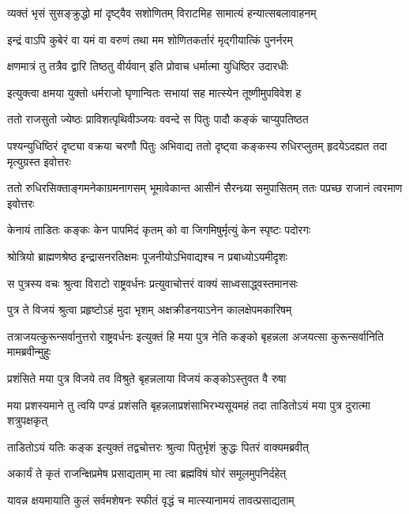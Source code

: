\twolineshloka
{व्यक्तं भृसं सुसङ्क्रुद्धो मां दृष्ट्वैव सशोणितम्}
{विराटमिह सामात्यं हन्यात्सबलावाहनम्}


\twolineshloka
{इन्द्रं वाऽपि कुबेरं वा यमं वा वरुणं तथा}
{मम शोणितकर्तारं मृद्गीयात्किं पुनर्नरम्}


\twolineshloka
{क्षणमात्रं तु तत्रैव द्वारि तिष्ठतु वीर्यवान्}
{इति प्रोवाच धर्मात्मा युधिष्ठिर उदारधीः}


\twolineshloka
{इत्युक्त्वा क्षमया युक्तो धर्मराजो घृणान्वितः}
{सभायां सह मात्स्येन तूष्णीमुपविवेश ह}


\twolineshloka
{ततो राजसुतो ज्येष्ठः प्राविशत्पृथिवीञ्जयः}
{ववन्दे स पितुः पादौ कङ्कं चाप्युपतिष्ठत}


\threelineshloka
{पश्यन्युधिष्ठिरं दृष्ट्या वक्रया चरणौ पितुः}
{अभिवाद्य ततो दृष्ट्वा कङ्कस्य रुधिरप्लुतम्}
{हृदयेऽदह्यत तदा मृत्युग्रस्त इवोत्तरः}


\threelineshloka
{ततो रुधिरसिक्ताङ्गमनेकाग्रमनागसम्}
{भूमावेकान्त आसीनं सैरन्ध्र्या समुपासितम्}
{ततः पप्रच्छ राजानं त्वरमाण इवोत्तरः}


\twolineshloka
{केनायं ताडितः कङ्कः केन पापमिदं कृतम्}
{को वा जिगमिषुर्मृत्युं केन स्पृष्टः पदोरगः}


\twolineshloka
{श्रोत्रियो ब्राह्मणश्रेष्ठ इन्द्रासनरतिक्षमः}
{पूजनीयोऽभिवाद्यश्च न प्रबाध्योऽयमीदृशः}



\twolineshloka
{स पुत्रस्य वचः श्रुत्वा विराटो राष्ट्रवर्धनः}
{प्रत्युवाचोत्तरं वाक्यं साध्वसाद्ध्वस्तमानसः}


\twolineshloka
{पुत्र ते विजयं श्रुत्वा प्रहृष्टोऽहं मुदा भृशम्}
{अक्षक्रीडनयाऽनेन कालक्षेपमकारिषम्}


\threelineshloka
{तत्राजयत्कुरून्सर्वानुत्तरो राष्ट्रवर्धनः}
{इत्युक्तं हि मया पुत्र नेति कङ्को बृहन्नला}
{अजयत्सा कुरून्सर्वानिति मामब्रवीन्मुहुः}


\twolineshloka
{प्रशंसिते मया पुत्र विजये तव विश्रुते}
{बृहन्नलाया विजयं कङ्कोऽस्तुवत वै रुषा}


\threelineshloka
{मया प्रशस्यमाने तु त्वयि पण्डं प्रशंसति}
{बृहन्नलाप्रशंसाभिरभ्यसूयमहं तदा}
{ताडितोऽयं मया पुत्र दुरात्मा शत्रुपक्षकृत्}


\twolineshloka
{ताडितोऽयं यतिः कङ्क इत्युक्तं तद्वचोत्तरः}
{श्रुत्वा पितुर्भृशं क्रुद्धः पितरं वाक्यमब्रवीत्}


\twolineshloka
{अकार्यं ते कृतं राजन्क्षिप्रमेष प्रसाद्यताम्}
{मा त्वा ब्रह्मविषं घोरं समूलमुपनिर्दहेत्}


\twolineshloka
{यावन्न क्षयमायाति कुलं सर्वमशेषनः}
{स्फीतं वृद्धं च मात्स्यानामयं तावत्प्रसाद्यताम्}


